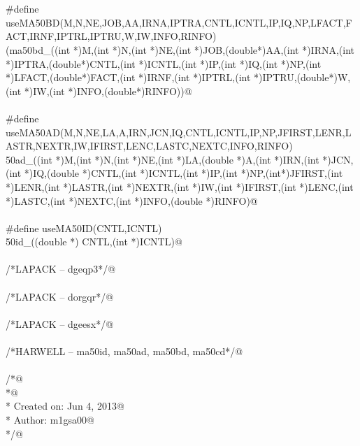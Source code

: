 \documentclass[12pt]{article}
\begin{document}
\begin{flushleft}
\begin{minipage}{\linewidth}
\begin{list}{}{}
\mbox{}\verb@@\\
\mbox{}\verb@@\\
\mbox{}\verb@#define useMA50BD(M,N,NE,JOB,AA,IRNA,IPTRA,CNTL,ICNTL,IP,IQ,NP,LFACT,FACT,IRNF,IPTRL,IPTRU,W,IW,INFO,RINFO)\@\\
\mbox{}\verb@(ma50bd_((int *)M,(int *)N,(int *)NE,(int *)JOB,(double*)AA,(int *)IRNA,(int *)IPTRA,(double*)CNTL,(int *)ICNTL,(int *)IP,(int *)IQ,(int *)NP,(int *)LFACT,(double*)FACT,(int *)IRNF,(int *)IPTRL,(int *)IPTRU,(double*)W,(int *)IW,(int *)INFO,(double*)RINFO))@\\
\mbox{}\verb@@\\
\mbox{}\verb@#define useMA50AD(M,N,NE,LA,A,IRN,JCN,IQ,CNTL,ICNTL,IP,NP,JFIRST,LENR,LASTR,NEXTR,IW,IFIRST,LENC,LASTC,NEXTC,INFO,RINFO)\@\\
\mbox{}\verb@ma50ad_((int *)M,(int *)N,(int *)NE,(int *)LA,(double *)A,(int *)IRN,(int *)JCN,(int *)IQ,(double *)CNTL,(int *)ICNTL,(int *)IP,(int *)NP,(int*)JFIRST,(int *)LENR,(int *)LASTR,(int *)NEXTR,(int *)IW,(int *)IFIRST,(int *)LENC,(int *)LASTC,(int *)NEXTC,(int *)INFO,(double *)RINFO)@\\
\mbox{}\verb@@\\
\mbox{}\verb@#define useMA50ID(CNTL,ICNTL)\@\\
\mbox{}\verb@ma50id_((double *) CNTL,(int *)ICNTL)@\\
\mbox{}\verb@@\\
\mbox{}\verb@/*LAPACK -- dgeqp3*/@\\
\mbox{}\verb@@\\
\mbox{}\verb@/*LAPACK -- dorgqr*/@\\
\mbox{}\verb@@\\
\mbox{}\verb@/*LAPACK -- dgeesx*/@\\
\mbox{}\verb@@\\
\mbox{}\verb@/*HARWELL -- ma50id, ma50ad, ma50bd, ma50cd*/@\\
\mbox{}\verb@@\\
\mbox{}\verb@/*@\\
\mbox{}\verb@ *@\\
\mbox{}\verb@ *  Created on: Jun 4, 2013@\\
\mbox{}\verb@ *      Author: m1gsa00@\\
\mbox{}\verb@ */@\\
\mbox{}\verb@@\\
\mbox{}\verb@@\\
\mbox{}\verb@@\\
\mbox{}\verb@@\\
\mbox{}\verb@@\\
\mbox{}\verb@@\\
\mbox{}\verb@@{\NWsep}
\end{list}
\vspace{-1.5ex}
\footnotesize
\begin{list}{}{\setlength{\itemsep}{-\parsep}\setlength{\itemindent}{-\leftmargin}}

\item{}
\end{list}
\end{minipage}\vspace{4ex}
\end{flushleft}
\appendix
\end{document}
